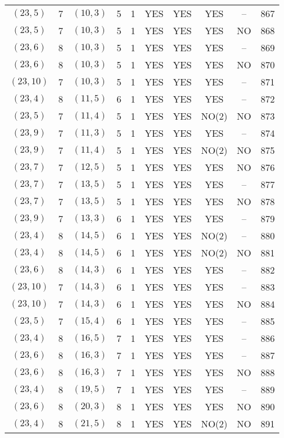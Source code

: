 \begin{longtable}{|c|c|c|c|c|c|c|c|c|c|}
$(23, 5)$ & 7 & $(10, 3)$ & 5 & 1 & YES & YES & YES & -- & 867\\
$(23, 5)$ & 7 & $(10, 3)$ & 5 & 1 & YES & YES & YES & NO & 868\\
$(23, 6)$ & 8 & $(10, 3)$ & 5 & 1 & YES & YES & YES & -- & 869\\
$(23, 6)$ & 8 & $(10, 3)$ & 5 & 1 & YES & YES & YES & NO & 870\\
$(23, 10)$ & 7 & $(10, 3)$ & 5 & 1 & YES & YES & YES & -- & 871\\
$(23, 4)$ & 8 & $(11, 5)$ & 6 & 1 & YES & YES & YES & -- & 872\\
$(23, 5)$ & 7 & $(11, 4)$ & 5 & 1 & YES & YES & NO(2) & NO & 873\\
$(23, 9)$ & 7 & $(11, 3)$ & 5 & 1 & YES & YES & YES & -- & 874\\
$(23, 9)$ & 7 & $(11, 4)$ & 5 & 1 & YES & YES & NO(2) & NO & 875\\
$(23, 7)$ & 7 & $(12, 5)$ & 5 & 1 & YES & YES & YES & NO & 876\\
$(23, 7)$ & 7 & $(13, 5)$ & 5 & 1 & YES & YES & YES & -- & 877\\
$(23, 7)$ & 7 & $(13, 5)$ & 5 & 1 & YES & YES & YES & NO & 878\\
$(23, 9)$ & 7 & $(13, 3)$ & 6 & 1 & YES & YES & YES & -- & 879\\
$(23, 4)$ & 8 & $(14, 5)$ & 6 & 1 & YES & YES & NO(2) & -- & 880\\
$(23, 4)$ & 8 & $(14, 5)$ & 6 & 1 & YES & YES & NO(2) & NO & 881\\
$(23, 6)$ & 8 & $(14, 3)$ & 6 & 1 & YES & YES & YES & -- & 882\\
$(23, 10)$ & 7 & $(14, 3)$ & 6 & 1 & YES & YES & YES & -- & 883\\
$(23, 10)$ & 7 & $(14, 3)$ & 6 & 1 & YES & YES & YES & NO & 884\\
$(23, 5)$ & 7 & $(15, 4)$ & 6 & 1 & YES & YES & YES & -- & 885\\
$(23, 4)$ & 8 & $(16, 5)$ & 7 & 1 & YES & YES & YES & -- & 886\\
$(23, 6)$ & 8 & $(16, 3)$ & 7 & 1 & YES & YES & YES & -- & 887\\
$(23, 6)$ & 8 & $(16, 3)$ & 7 & 1 & YES & YES & YES & NO & 888\\
$(23, 4)$ & 8 & $(19, 5)$ & 7 & 1 & YES & YES & YES & -- & 889\\
$(23, 6)$ & 8 & $(20, 3)$ & 8 & 1 & YES & YES & YES & NO & 890\\
$(23, 4)$ & 8 & $(21, 5)$ & 8 & 1 & YES & YES & NO(2) & NO & 891\\

\end{longtable}
